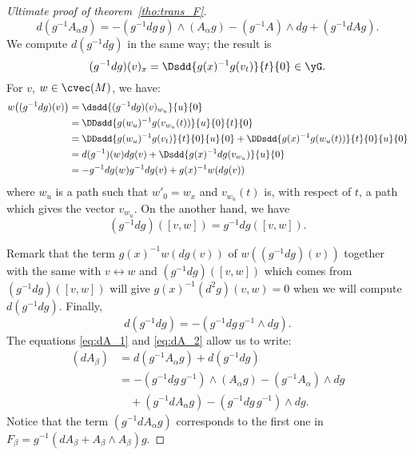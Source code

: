 \begin{proof}[Ultimate proof of theorem~\ref{tho:trans_F}]
\begin{equation}\label{eq:dA_1}
  d(g^{-1} A_{\alpha} g)=-(g^{-1} dg\,g)\wedge(A_{\alpha} g)-(g^{-1} A)\wedge dg+(g^{-1} dA g).
\end{equation}
We compute $d(g^{-1} dg)$ in the same way; the result is
\[
   (g^{-1} dg)(v)_x=\Dsdd{g(x)^{-1} g(v_t)}{t}{0}\in\yG.
\]
For $v$, $w\in\cvec(M)$, we have:
\begin{equation}
\begin{split}
   w\big((g^{-1} dg)(v)\big)&=\dsdd{ (g^{-1} dg)(v)_{w_u} }{u}{0}\\
                   &=\DDsdd{  g(w_u)^{-1} g(v_{w_u}(t))  }{u}{0}{t}{0}\\
		   &=\DDsdd{  g(w_u)^{-1} g(v_t)  }{t}{0}{u}{0}
		      +\DDsdd{  g(x)^{-1} g(w_u(t))  }{t}{0}{u}{0}\\
		   &=d(g^{-1})(w)dg(v)+\Dsdd{ g(x)^{-1} dg(v_{w_u}) }{u}{0}\\
		   &=-g^{-1} dg(w)g^{-1} dg(v)+g(x)^{-1} w(dg(v))
\end{split}
\end{equation}
where $w_u$ is a path such that $w'_0=w_x$ and $v_{w_u}(t)$ is, with respect of $t$, a path which gives the vector $v_{w_u}$. On the another hand, we have
\[
   (g^{-1} dg)([v,w])=g^{-1} dg([v,w]).
\]

Remark that the term $g(x)^{-1} w(dg(v))$ of  $w((g^{-1} dg)(v))$ together with the same with $v\leftrightarrow w$ and $(g^{-1} dg)([v,w])$ which comes from  $(g^{-1} dg)([v,w])$ will give $g(x)^{-1}(d^2g)(v,w)=0$ when we will compute $d(g^{-1} dg)$.
Finally,
\begin{equation}\label{eq:dA_2}
   d(g^{-1} dg)=-(g^{-1} dg\,g^{-1}\wedge dg).
\end{equation}
The equations \eqref{eq:dA_1} and \eqref{eq:dA_2} allow us to write:
\begin{equation}\label{eq:dA}
\begin{split}
    (dA_{\beta})&=d(g^{-1} A_{\alpha} g)+d(g^{-1} dg)\\
              &=-(g^{-1} dg\,g^{-1}) \wedge(A_{\alpha} g)-(g^{-1} A_{\alpha})\wedge dg\\
	      &\quad+(g^{-1} dA_{\alpha} g)-(g^{-1} dg\,g^{-1})\wedge dg.
\end{split}
\end{equation}
Notice that the term $(g^{-1} dA_{\alpha} g)$ corresponds to the first one in $F_{\beta}=g^{-1}(dA_{\beta}+A_{\beta}\wedge A_{\beta})g$.


\end{proof}
